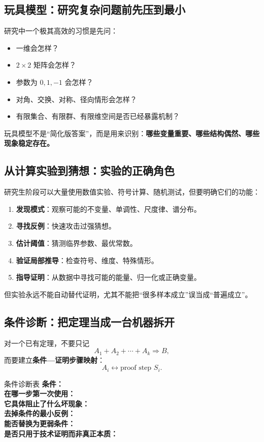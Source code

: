 \documentclass[11pt,a4paper]{ctexart}
\newcommand{\concept}[1]{\textbf{\color{deepblue}#1}}
\newcommand{\keyword}[1]{\textbf{#1}}
\begin{document}
\subsection{玩具模型：研究复杂问题前先压到最小}

研究中一个极其高效的习惯是先问：
\begin{itemize}
  \item 一维会怎样？
  \item $2\times2$ 矩阵会怎样？
  \item 参数为 $0,1,-1$ 会怎样？
  \item 对角、交换、对称、径向情形会怎样？
  \item 有限集合、有限群、有限维空间是否已经暴露机制？
\end{itemize}

玩具模型不是“简化版答案”，而是用来识别：\textbf{哪些变量重要、哪些结构偶然、哪些现象稳定存在。}

\subsection{从计算实验到猜想：实验的正确角色}

研究生阶段可以大量使用数值实验、符号计算、随机测试，但要明确它们的功能：

\begin{enumerate}
  \item \keyword{发现模式}：观察可能的不变量、单调性、尺度律、谱分布。
  \item \keyword{寻找反例}：快速攻击过强猜想。
  \item \keyword{估计阈值}：猜测临界参数、最优常数。
  \item \keyword{验证局部推导}：检查符号、维度、特殊情形。
  \item \keyword{指导证明}：从数据中寻找可能的能量、归一化或正确变量。
\end{enumerate}

但实验永远不能自动替代证明，尤其不能把“很多样本成立”误当成“普遍成立”。

\subsection{条件诊断：把定理当成一台机器拆开}

对一个已有定理，不要只记
\[
A_1+A_2+\cdots+A_k\Longrightarrow B,
\]
而要建立\concept{条件—证明步骤映射}：
\[
A_i\longleftrightarrow \text{proof step }S_i.
\]

\begin{templatebox}{条件诊断表}
\textbf{条件：}\\
\textbf{在哪一步第一次使用：}\\
\textbf{它具体阻止了什么坏现象：}\\
\textbf{去掉条件的最小反例：}\\
\textbf{能否替换为更弱条件：}\\
\textbf{是否只用于技术证明而非真正本质：}
\end{templatebox}
\end{document}
